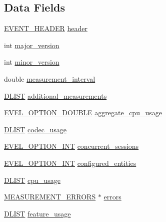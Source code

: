 \subsection*{Data Fields}
\begin{DoxyCompactItemize}
\item 
\hyperlink{evel_8h_aa0ea94c675729365ea7825c4fc7e06d8}{E\+V\+E\+N\+T\+\_\+\+H\+E\+A\+D\+ER} \hyperlink{structevent__measurement_a08892ef3b557b44dcc5e203a2bbcc2c4}{header}
\item 
int \hyperlink{structevent__measurement_a1d836edb847175d2d91b8571352a1dd6}{major\+\_\+version}
\item 
int \hyperlink{structevent__measurement_aa785a4d498682a323d0e11e376860346}{minor\+\_\+version}
\item 
double \hyperlink{structevent__measurement_a50125c8776bfb0f86393c796b0b99bb2}{measurement\+\_\+interval}
\item 
\hyperlink{double__list_8h_a45f4a129042d9e1aa4ffd31fe13e4d14}{D\+L\+I\+ST} \hyperlink{structevent__measurement_a4d4fe325bb6a86a64951252656f75ea4}{additional\+\_\+measurements}
\item 
\hyperlink{evel_8h_aafc42b3cd9aca88804c3d413e4ccec06}{E\+V\+E\+L\+\_\+\+O\+P\+T\+I\+O\+N\+\_\+\+D\+O\+U\+B\+LE} \hyperlink{structevent__measurement_acf0f0c714e72b5fb6dc75939f4f58e61}{aggregate\+\_\+cpu\+\_\+usage}
\item 
\hyperlink{double__list_8h_a45f4a129042d9e1aa4ffd31fe13e4d14}{D\+L\+I\+ST} \hyperlink{structevent__measurement_a9ef619061bb0185c063ede94a114a73c}{codec\+\_\+usage}
\item 
\hyperlink{evel_8h_a452d825778d1c2368a54b8f689a25ba7}{E\+V\+E\+L\+\_\+\+O\+P\+T\+I\+O\+N\+\_\+\+I\+NT} \hyperlink{structevent__measurement_a29075168af0c3f96b5606b1e707e3979}{concurrent\+\_\+sessions}
\item 
\hyperlink{evel_8h_a452d825778d1c2368a54b8f689a25ba7}{E\+V\+E\+L\+\_\+\+O\+P\+T\+I\+O\+N\+\_\+\+I\+NT} \hyperlink{structevent__measurement_aff8da1abcfbd005d70398418f8b12297}{configured\+\_\+entities}
\item 
\hyperlink{double__list_8h_a45f4a129042d9e1aa4ffd31fe13e4d14}{D\+L\+I\+ST} \hyperlink{structevent__measurement_a1a727089e82e56bdd7d4a3aa6a55fa16}{cpu\+\_\+usage}
\item 
\hyperlink{evel_8h_aea88424203894a4b4720600fe7131df7}{M\+E\+A\+S\+U\+R\+E\+M\+E\+N\+T\+\_\+\+E\+R\+R\+O\+RS} $\ast$ \hyperlink{structevent__measurement_abfc769938b8ba8047613b0f8ba704597}{errors}
\item 
\hyperlink{double__list_8h_a45f4a129042d9e1aa4ffd31fe13e4d14}{D\+L\+I\+ST} \hyperlink{structevent__measurement_a3bdd3e143db79d5ffc5b24cb875d3088}{feature\+\_\+usage}

\end{DoxyCompactItemize}
